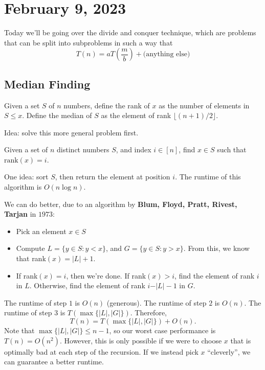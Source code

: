 \section{February 9, 2023}

Today we'll be going over the divide and conquer technique, which are problems that can be split into subproblems in such a way that 
\[T(n) = aT\left(\frac{m}{b}\right) + \text{(anything else)}\]

\subsection{Median Finding}

Given a set $S$ of $n$ numbers, define the rank of $x$ as the number of elements in $S\leq x$. Define the median of $S$ as the element of rank $\lfloor (n+1)/2\rfloor$. 

\hrulebar

Idea: solve this more general problem first. 

\begin{example}
\exlabel

Given a set of $n$ distinct numbers $S$, and index $i\in [n]$, find $x\in S$ such that $\text{rank}(x) = i$. 
\end{example}

One idea: sort $S$, then return the element at position $i$. The runtime of this algorithm is $O(n\log n)$. 

We can do better, due to an algorithm by \textbf{Blum, Floyd, Pratt, Rivest, Tarjan} in $1973$: 
\begin{itemize}
    \item Pick an element $x\in S$
    \item Compute $L = \{y\in S : y < x\}$, and $G = \{y\in S : y > x\}$. From this, we know that rank$(x) = \vert L\vert + 1$. 
    \item If rank$(x) = i$, then we're done. If rank$(x) > i$, find the element of rank $i$ in $L$. Otherwise, find the element of rank $i-\vert L\vert - 1$ in $G$.
\end{itemize}

The runtime of step $1$ is $O(n)$ (generous). The runtime of step $2$ is $O(n)$. The runtime of step $3$ is $T(\max\{\vert L\vert, \vert G\vert\})$. Therefore, 
\[T(n) = T(\max\{\vert L\vert, \vert G\vert\}) + O(n).\]
Note that $\max\{\vert L\vert, \vert G\vert\}\leq n-1$, so our worst case performance is $T(n) = O(n^2)$. However, this is only possible if we were to choose $x$ that is optimally bad at each step of the recursion. If we instead pick $x$ ``cleverly'', we can guarantee a better runtime. 

